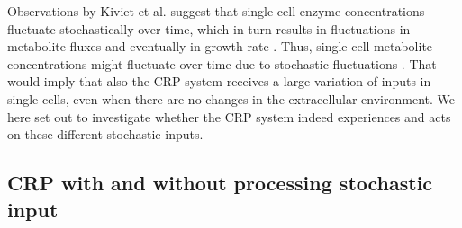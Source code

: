 %
Observations by Kiviet et al. suggest that single cell enzyme concentrations fluctuate stochastically over time, which in turn results in fluctuations in metabolite fluxes and eventually in growth rate \cite{Kiviet2014}.
%
Thus, single cell metabolite concentrations might fluctuate over time due to stochastic fluctuations .
That would imply that also the CRP system receives a large variation of inputs in single cells, even when there are no changes in the extracellular environment.
%
%
We here set out to investigate whether the CRP system indeed experiences and acts on these different stochastic inputs.

\subsection*{CRP with and without processing stochastic input}

